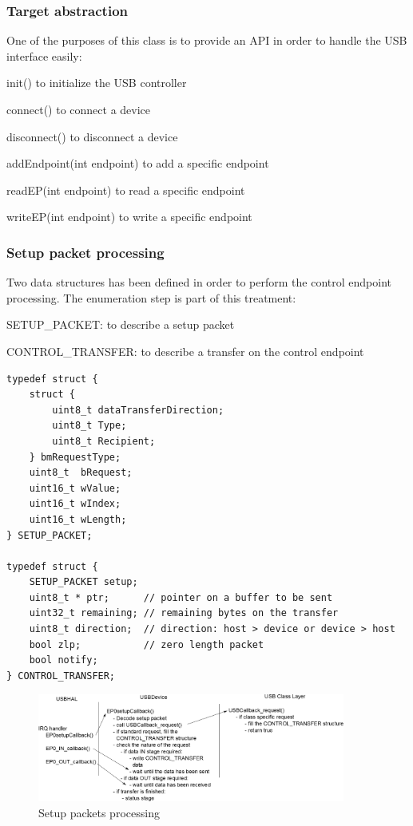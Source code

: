 \documentclass[pdftex,10pt,a4paper]{report}
\newenvironment{packed_item}{
\begin{itemize}
  \setlength{\itemsep}{1pt}
  \setlength{\parskip}{0pt}
  \setlength{\parsep}{0pt}
}{\end{itemize}}
\begin{document}
\subsubsection{Target abstraction}
One of the purposes of this class is to provide an API in order to handle the USB interface easily:
\begin{packed_item}
	\item init() to initialize the USB controller
	\item connect() to connect a device
	\item disconnect() to disconnect a device
	\item addEndpoint(int endpoint) to add a specific endpoint
	\item readEP(int endpoint) to read a specific endpoint
	\item writeEP(int endpoint) to write a specific endpoint 
\end{packed_item}

\subsubsection{Setup packet processing}
Two data structures has been defined in order to perform the control endpoint processing. The enumeration step is part of this treatment:
\begin{packed_item}
	\item SETUP\_PACKET: to describe a setup packet
	\item CONTROL\_TRANSFER: to describe a transfer on the control endpoint
\end{packed_item}


\begin{lstlisting}[label=Data structures for control endpoint processing,caption=Data structures for control endpoint processing]
typedef struct {
    struct {
        uint8_t dataTransferDirection;
        uint8_t Type;
        uint8_t Recipient;
    } bmRequestType;
    uint8_t  bRequest;
    uint16_t wValue;
    uint16_t wIndex;
    uint16_t wLength;
} SETUP_PACKET;

typedef struct {
    SETUP_PACKET setup;
    uint8_t * ptr;      // pointer on a buffer to be sent
    uint32_t remaining; // remaining bytes on the transfer
    uint8_t direction;  // direction: host > device or device > host
    bool zlp;           // zero length packet
    bool notify;
} CONTROL_TRANSFER;
\end{lstlisting}

\begin{figure}[h!]
		\centering
		\includegraphics[width=0.9\textwidth]{./setup_packets.jpg}
		\caption{Setup packets processing}
		\label{Setup packets processing}
\end{figure}
\end{document}
